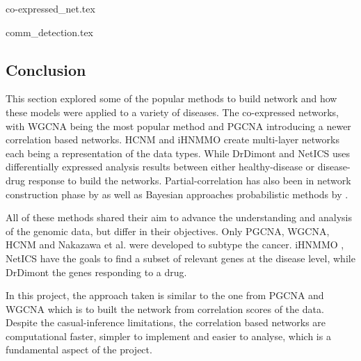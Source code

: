 {co-expressed_net.tex}

{comm_detection.tex}


\subsection{Conclusion} 

This section explored some of the popular methods to build network and how these models were applied to a variety of diseases. The co-expressed networks, with WGCNA \cite{Langfelder2008-sn} being the most popular method and PGCNA \cite{Care2019-ij} introducing a newer correlation based networks. HCNM \cite{Vangimalla2021-fc} and iHNMMO \citet{Peng2017-ik} create multi-layer networks each being a representation of the data types. While DrDimont \cite{Hiort2022-lk} and NetICS \citet{Dimitrakopoulos2018-br} uses differentially expressed analysis results between either healthy-disease or disease-drug response to build the networks. Partial-correlation has also been in network construction phase by \citet{De_la_Fuente2004-ts} as well as Bayesian approaches  probabilistic methods by \cite{Nakazawa2021-yq, Tamada2011-ok, Tanaka2020-mw}.

All of these methods shared their aim to advance the understanding and analysis of the genomic data, but differ in their objectives. Only PGCNA, WGCNA, HCNM and Nakazawa et al.\cite{Care2019-ij, Langfelder2008-sn, Nakazawa2021-yq,  Vangimalla2021-fc} were developed to subtype the cancer. iHNMMO \cite{Peng2017-ik}, NetICS \cite{Dimitrakopoulos2018-br} have the goals to find a subset of relevant genes at the disease level, while DrDimont \cite{Hiort2022-lk} the genes responding to a drug. 

In this project, the approach taken is similar to the one from PGCNA and WGCNA which is to built the network from correlation scores of the data. Despite the casual-inference limitations, the correlation based networks are computational faster, simpler to implement and easier to analyse, which is a fundamental aspect of the project.






